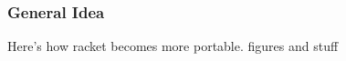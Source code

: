 \subsubsection{General Idea}
\label{subsec:racket-expand}

Here's how racket becomes more portable. figures and stuff
